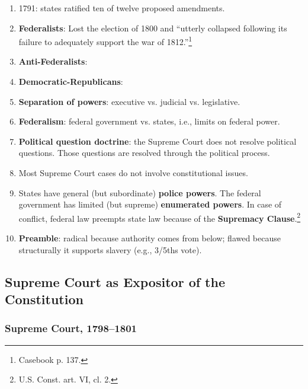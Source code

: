 \begin{enumerate}
\begin{enumerate}
        shall not be done which there is no power to do?~.~.~.~it is evident 
        it would furnish to men disposed to usurp, a plausible pretence for 
        claiming that power.''\footnote{Casebook p. 25.}
        \item Anti-federalist responses to Hamilton's argument pointed out 
        that the Constitution emphasizes limitations elsewhere, e.g., the 
        limitation on granting titles of nobility.\footnote{U.S. Const. art. 
        I, \S\ 9; casebook p. 26.}
    \end{enumerate}
    \item 1791: states ratified ten of twelve proposed amendments.
    \item \textbf{Federalists}: %
    Lost the election of 1800 and ``utterly collapsed following its failure to 
    adequately support the war of 1812.''\footnote{Casebook p. 137.}
    \item \textbf{Anti-Federalists}: %
    \item \textbf{Democratic-Republicans}: %
    \item \textbf{Separation of powers}: executive vs. judicial vs. 
    legislative.
    \item \textbf{Federalism}: federal government vs. states, i.e., limits on 
    federal power.
    \item \textbf{Political question doctrine}: the Supreme Court does not 
    resolve political questions. Those questions are resolved through the 
    political process.
    \item Most Supreme Court cases do not involve constitutional issues.
    \item States have general (but subordinate) \textbf{police powers}. The 
    federal government has limited (but supreme) \textbf{enumerated powers}. 
    In case of conflict, federal law preempts state law because of the 
    \textbf{Supremacy Clause}.\footnote{U.S. Const. art. VI, cl. 2.}
    \item \textbf{Preamble}: radical because authority comes from below; 
    flawed because structurally it supports slavery (e.g., 3/5ths vote).
\end{enumerate}

\subsection{Supreme Court as Expositor of the Constitution}

\subsubsection{Supreme Court, 1798--1801}

